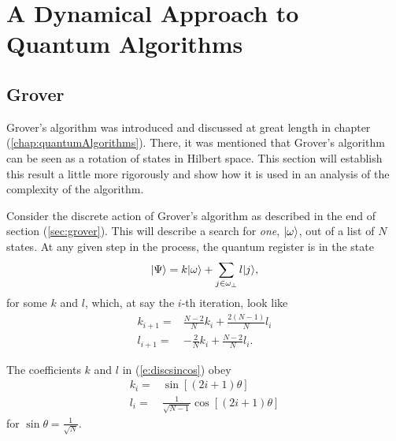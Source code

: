 
\chapter{A Dynamical Approach to Quantum Algorithms}
\label{chap:dynamics}
%

\section{Grover}

\label{sec:sincos}

Grover's algorithm was introduced and discussed at great length in
chapter (\ref{chap:quantumAlgorithms}).  There, it was mentioned that
Grover's algorithm can be seen as a rotation of states in Hilbert
space.  This section will establish this result a little more rigorously 
and show how it is used in an analysis of the complexity of the algorithm.

Consider the discrete action of Grover's algorithm as described in the end of
section (\ref{sec:grover}).  This will describe a search for \emph{one},
${|{\omega}\rangle}$,
out of a list of $N$ states.  At any given step in the process, the
quantum register is in the state
\begin{equation}
{|{\Psi}\rangle} = k{|{\omega}\rangle} + \sum_{j\in\omega_\perp}l{|{j}\rangle},
\end{equation}
for some $k$ and $l$, which, at say the $i$-th iteration, 
look like
\begin{equation}
\begin{split}
k_{i+1} =& \frac{N-2}{N}k_i + \frac{2(N-1)}{N}l_i\\
l_{i+1} =& -\frac{2}{N}k_i + \frac{N-2}{N}l_i.
\end{split}
\label{e:discsincos}
\end{equation}

\begin{prop}
The coefficients $k$ and $l$ in (\ref{e:discsincos}) obey
\begin{equation}
\begin{split}
k_i =& \sin\left[\left(2i+1\right)\theta\right]\\
l_i =& \frac{1}{\sqrt{N-1}}\cos\left[\left(2i+1\right)\theta\right]
\end{split}
\label{e:sincos}
\end{equation}
for $\sin\theta = \frac{1}{\sqrt{N}}$.
\end{prop}


